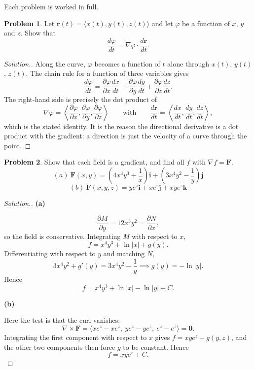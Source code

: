 \documentclass[11pt,a4paper]{article}
\theoremstyle{definition}
\newtheorem{problemx}{Problem}[subsection]
\newenvironment{problem}{\begin{problemx}}{\end{problemx}}
\newenvironment{solution}
  {\renewcommand{\qedsymbol}{}\begin{proof}[\textit{Solution}.]}
  {\end{proof}}
\newcommand{\subhead}[1]{%
  \par\medskip\noindent\textbf{#1}\par\nobreak\smallskip}
\begin{document}
Each problem is worked in full.

\begin{problem}
Let $\mathbf r(t) = \langle x(t), y(t), z(t)\rangle$ and let $\varphi$ be a
function of $x$, $y$ and $z$. Show that
\[\frac{d\varphi}{dt} = \nabla\varphi\cdot\frac{d\mathbf r}{dt}.\]
\end{problem}
\begin{solution}
Along the curve, $\varphi$ becomes a function of $t$ alone through
$x(t)$, $y(t)$, $z(t)$. The chain rule for a function of three variables gives
\[\frac{d\varphi}{dt}
= \frac{\partial\varphi}{\partial x}\frac{dx}{dt}
+ \frac{\partial\varphi}{\partial y}\frac{dy}{dt}
+ \frac{\partial\varphi}{\partial z}\frac{dz}{dt}.\]
The right-hand side is precisely the dot product of
\[\nabla\varphi = \left\langle \frac{\partial\varphi}{\partial x},
\frac{\partial\varphi}{\partial y},
\frac{\partial\varphi}{\partial z}\right\rangle
\qquad\text{with}\qquad
\frac{d\mathbf r}{dt} = \left\langle \frac{dx}{dt}, \frac{dy}{dt},
\frac{dz}{dt}\right\rangle ,\]
which is the stated identity. It is the reason the directional derivative is a
dot product with the gradient: a direction is just the velocity of a curve
through the point.
\end{solution}

\begin{problem}
Show that each field is a gradient, and find all $f$ with $\nabla f = \mathbf{F}$.
\[(a)\ \mathbf{F}(x,y) = \left(4x^3y^3+\frac1x\right)\mathbf{i}
+ \left(3x^4y^2-\frac1y\right)\mathbf{j}\]
\[(b)\ \mathbf{F}(x,y,z) = ye^z\mathbf{i} + xe^z\mathbf{j} + xye^z\mathbf{k}\]
\end{problem}
\begin{solution}
\subhead{(a)}
\[\frac{\partial M}{\partial y} = 12x^3y^2 = \frac{\partial N}{\partial x},\]
so the field is conservative. Integrating $M$ with respect to $x$,
\[f = x^4y^3 + \ln\left|x\right| + g(y).\]
Differentiating with respect to $y$ and matching $N$,
\[3x^4y^2 + g'(y) = 3x^4y^2 - \frac1y \implies g(y) = -\ln\left|y\right| .\]
Hence
\[f = x^4y^3 + \ln\left|x\right| - \ln\left|y\right| + C .\]

\subhead{(b)}
Here the test is that the curl vanishes:
\[\nabla\times\mathbf{F}
= \langle xe^z-xe^z,\ ye^z-ye^z,\ e^z-e^z\rangle = \textbf{0}.\]
Integrating the first component with respect to $x$ gives
$f = xye^z + g(y,z)$, and the other two components then force $g$ to be
constant. Hence
\[f = xye^z + C .\]
\end{solution}
\end{document}
